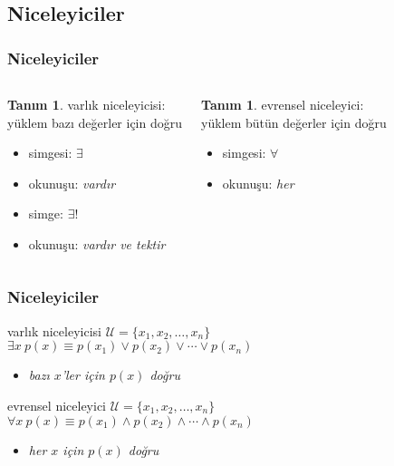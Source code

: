 \documentclass[dvipsnames]{beamer}
\theoremstyle{definition}
\newtheorem{tanim}[theorem]{Tanım}
\theoremstyle{example}
\theoremstyle{plain}
\begin{document}
\subsection{Niceleyiciler}

\begin{frame}
  \frametitle{Niceleyiciler}

  \begin{columns}[t]
    \begin{tanim}
      \alert{varlık niceleyicisi}:\\
        yüklem bazı değerler için doğru

      \begin{itemize}
        \item simgesi: $\exists$
        \item okunuşu: \emph{vardır}

        \pause
        \medskip
        \item simge: $\exists!$
        \item okunuşu: \emph{vardır ve tektir}
      \end{itemize}
    \end{tanim}

    \pause
    \begin{tanim}
      \alert{evrensel niceleyici}:\\
        yüklem bütün değerler için doğru

      \begin{itemize}
        \item simgesi: $\forall$
        \item okunuşu: \emph{her}
      \end{itemize}
    \end{tanim}
  \end{columns}
\end{frame}

\begin{frame}
  \frametitle{Niceleyiciler}

  \begin{block}{varlık niceleyicisi}
    $\mathcal{U} = \{x_1,x_2,\ldots,x_n\}$\\
    $\exists x~p(x) \equiv p(x_1) \vee p(x_2) \vee \cdots \vee p(x_n)$

    \begin{itemize}
      \item \emph{bazı $x$'ler için $p(x)$ doğru}
    \end{itemize}
  \end{block}

  \pause
  \begin{block}{evrensel niceleyici}
    $\mathcal{U} = \{x_1,x_2,\ldots,x_n\}$\\
    $\forall x~p(x) \equiv p(x_1) \wedge p(x_2) \wedge \cdots \wedge p(x_n)$

    \begin{itemize}
      \item \emph{her $x$ için $p(x)$ doğru}
    \end{itemize}
  \end{block}
\end{frame}
\end{document}
